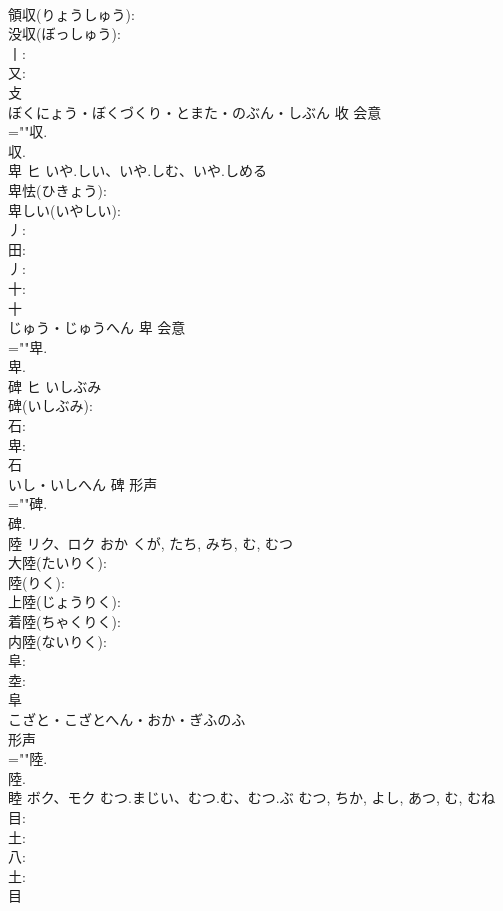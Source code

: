 \documentclass[8pt]{extreport}
\begin{document}
\begin{CJK}{UTF8}{min}
\\	領収(りょうしゅう): 
\\	没収(ぼっしゅう): 
\\	丨: 
\\	又: 
\\	攴	
\\	ぼくにょう・ぼくづくり・とまた・のぶん・しぶん	收	会意 
\\	=""収.
\\	収.
\\	卑	ヒ	いや.しい、いや.しむ、いや.しめる		
\\	卑怯(ひきょう): 
\\	卑しい(いやしい): 
\\	丿: 
\\	田: 
\\	丿: 
\\	十: 
\\	十	
\\	じゅう・じゅうへん	卑	会意 
\\	=""卑.
\\	卑.
\\	碑	ヒ	いしぶみ		
\\	碑(いしぶみ): 
\\	石: 
\\	卑: 
\\	石	
\\	いし・いしへん	碑	形声 
\\	=""碑.
\\	碑.
\\	陸	リク、ロク	おか	くが, たち, みち, む, むつ	
\\	大陸(たいりく): 
\\	陸(りく): 
\\	上陸(じょうりく): 
\\	着陸(ちゃくりく): 
\\	内陸(ないりく): 
\\	阜: 
\\	坴: 
\\	阜	
\\	こざと・こざとへん・おか・ぎふのふ	
\\	形声 
\\	=""陸.
\\	陸.
\\	睦	ボク、モク	むつ.まじい、むつ.む、むつ.ぶ	むつ, ちか, よし, あつ, む, むね	
\\	目: 
\\	土: 
\\	八: 
\\	土: 
\\	目	

\end{CJK}
\end{document}

